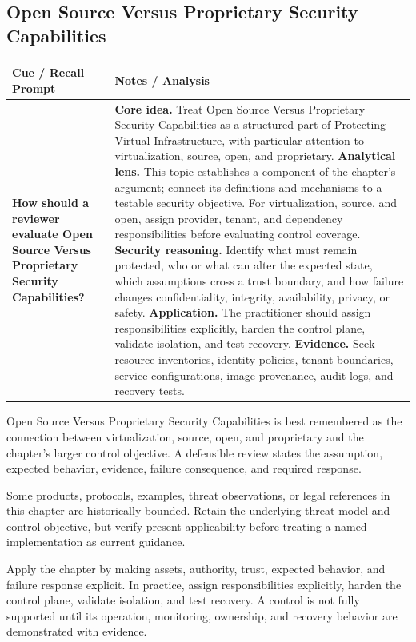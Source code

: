 \documentclass[11pt]{article}
\newcommand{\CornellHeader}{%
\rowcolor{Navy}\color{white}\bfseries Cue / Recall Prompt & \color{white}\bfseries Notes / Analysis\\\hline}
\newcommand{\CornellRow}[2]{%
\cellcolor{CueGray}\RaggedRight\textbf{#1} & \RaggedRight #2\\\hline}
\begin{document}
\subsection*{Open Source Versus Proprietary Security Capabilities}
\begin{longtable}{>{\RaggedRight\arraybackslash}p{}|>{\RaggedRight\arraybackslash}p{}}
\CornellHeader
\CornellRow{How should a reviewer evaluate Open Source Versus Proprietary Security Capabilities?}{\textbf{Core idea.} Treat Open Source Versus Proprietary Security Capabilities as a structured part of Protecting Virtual Infrastructure, with particular attention to virtualization, source, open, and proprietary. \textbf{Analytical lens.} This topic establishes a component of the chapter's argument; connect its definitions and mechanisms to a testable security objective. For virtualization, source, and open, assign provider, tenant, and dependency responsibilities before evaluating control coverage. \textbf{Security reasoning.} Identify what must remain protected, who or what can alter the expected state, which assumptions cross a trust boundary, and how failure changes confidentiality, integrity, availability, privacy, or safety. \textbf{Application.} The practitioner should assign responsibilities explicitly, harden the control plane, validate isolation, and test recovery. \textbf{Evidence.} Seek resource inventories, identity policies, tenant boundaries, service configurations, image provenance, audit logs, and recovery tests.}
\end{longtable}
\begin{topicsummary}
Open Source Versus Proprietary Security Capabilities is best remembered as the connection between virtualization, source, open, and proprietary and the chapter's larger control objective. A defensible review states the assumption, expected behavior, evidence, failure consequence, and required response.
\end{topicsummary}
\begin{historybox}
Some products, protocols, examples, threat observations, or legal references in this chapter are historically bounded. Retain the underlying threat model and control objective, but verify present applicability before treating a named implementation as current guidance.
\end{historybox}
\begin{defensebox}
Apply the chapter by making assets, authority, trust, expected behavior, and failure response explicit. In practice, assign responsibilities explicitly, harden the control plane, validate isolation, and test recovery. A control is not fully supported until its operation, monitoring, ownership, and recovery behavior are demonstrated with evidence.
\end{defensebox}
\end{document}
